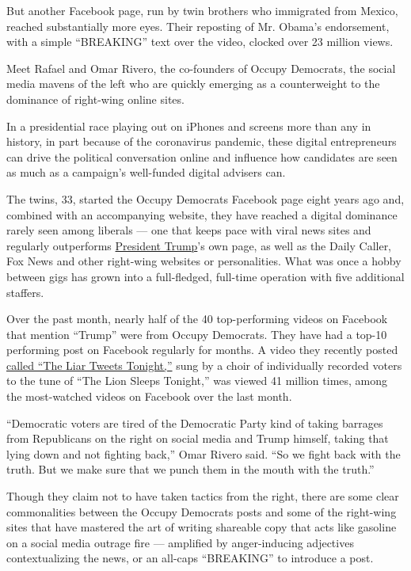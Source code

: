 But another Facebook page, run by twin brothers who immigrated from
Mexico, reached substantially more eyes. Their reposting of Mr. Obama's
endorsement, with a simple ``BREAKING'' text over the video, clocked
over 23 million views.

Meet Rafael and Omar Rivero, the co-founders of Occupy Democrats, the
social media mavens of the left who are quickly emerging as a
counterweight to the dominance of right-wing online sites.

In a presidential race playing out on iPhones and screens more than any
in history, in part because of the coronavirus pandemic, these digital
entrepreneurs can drive the political conversation online and influence
how candidates are seen as much as a campaign's well-funded digital
advisers can.

The twins, 33, started the Occupy Democrats Facebook page eight years
ago and, combined with an accompanying website, they have reached a
digital dominance rarely seen among liberals --- one that keeps pace
with viral news sites and regularly outperforms
\href{https://www.nytimes3xbfgragh.onion/interactive/2020/us/elections/donald-trump.html}{President
Trump}'s own page, as well as the Daily Caller, Fox News and other
right-wing websites or personalities. What was once a hobby between gigs
has grown into a full-fledged, full-time operation with five additional
staffers.

Over the past month, nearly half of the 40 top-performing videos on
Facebook that mention ``Trump'' were from Occupy Democrats. They have
had a top-10 performing post on Facebook regularly for months. A video
they recently posted
\href{https://www.facebookcorewwwi.onion/watch/?v=236673061013278}{called
``The Liar Tweets Tonight,''} sung by a choir of individually recorded
voters to the tune of ``The Lion Sleeps Tonight,'' was viewed 41 million
times, among the most-watched videos on Facebook over the last month.

``Democratic voters are tired of the Democratic Party kind of taking
barrages from Republicans on the right on social media and Trump
himself, taking that lying down and not fighting back,'' Omar Rivero
said. ``So we fight back with the truth. But we make sure that we punch
them in the mouth with the truth.''

Though they claim not to have taken tactics from the right, there are
some clear commonalities between the Occupy Democrats posts and some of
the right-wing sites that have mastered the art of writing shareable
copy that acts like gasoline on a social media outrage fire ---
amplified by anger-inducing adjectives contextualizing the news, or an
all-caps ``BREAKING'' to introduce a post.

